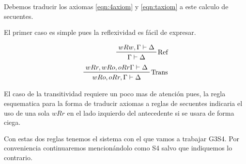 Debemos traducir los axiomas \eqref{eqn:4axiom} y \eqref{eqn:taxiom} a este calculo de secuentes. 

El primer caso es simple pues la reflexividad es fácil de expresar.

\begin{align*}
  \tree{Ref}{wRw, \Gamma \derives \Delta}{\Gamma \derives \Delta} \\
  \tree{Trans}{wRr, wRo, oRr \Gamma \derives \Delta}{wRo, oRr, \Gamma \derives \Delta}
\end{align*}

El caso de la transitividad requiere un poco mas de atención pues, la regla esquematica para la forma de traducir axiomas a reglas de secuentes indicaria el uso de una sola $wRr$ en el lado izquierdo del antecedente si se usara de forma ciega.


Con estas dos reglas tenemos el sistema con el que vamos a trabajar G3S4. Por conveniencia continuaremos mencionándolo como S4 salvo que indiquemos lo contrario.

